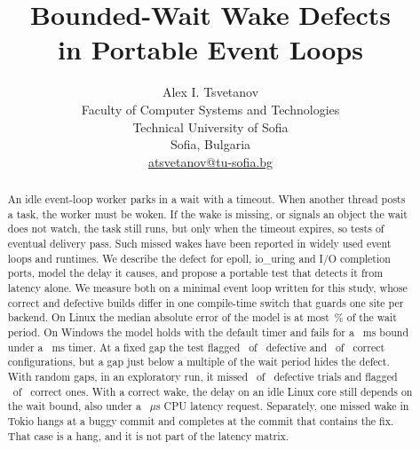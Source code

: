 
\usepackage{pgfplots}
\usepackage{pgfplotstable}
\pgfplotsset{compat=1.18}

\newcommand{\Beff}{B_{\mathrm{eff}}}
\newcommand{\PaperRepoAvailability}{is available}
\newcommand{\PaperRepo}{\url{https://github.com/Alex-Tsvetanov/paper-wake-defect}}
\newcommand{\BibHyphen}[1]{-}



\title{Bounded-Wait Wake Defects\\ in Portable Event Loops}

\author{Alex I. Tsvetanov\\
Faculty of Computer Systems and Technologies\\
Technical University of Sofia\\
Sofia, Bulgaria\\
\href{mailto:atsvetanov@tu-sofia.bg}{atsvetanov@tu-sofia.bg}}

\date{}
\maketitle

\begin{abstract}
An idle event-loop worker parks in a wait with a timeout. When another thread posts a task,
the worker must be woken. If the wake is missing, or signals an object the wait does not
watch, the task still runs, but only when the timeout expires, so tests of eventual delivery
pass. Such missed wakes have been reported in widely used event loops and runtimes. We describe
the defect for epoll, io\_uring and I/O completion ports, model the delay it causes, and
propose a portable test that detects it from latency alone. We measure both on a minimal event
loop written for this study, whose correct and defective builds differ in one compile-time
switch that guards one site per backend. On Linux the median absolute error of the model is at
most \WakeHOneLinuxMaxPct\,\% of the wait period. On Windows the model holds with the default
timer and fails for a \WakeBSmallMs~ms bound under a \WakeTimerRequestedMs~ms timer. At a fixed
gap the test flagged \WakeDetectDefectFlagged\ of \WakeDetectDefectConfigs\ defective and
\WakeDetectFixedFlagged\ of \WakeDetectFixedConfigs\ correct configurations, but a gap just
below a multiple of the wait period hides the defect. With random gaps, in an exploratory run,
it missed \WakeRandomDefectMissed\ of \WakeRandomDefectTrials\ defective trials and flagged
\WakeRandomFixedFlagged\ of \WakeRandomFixedTrials\ correct ones. With a correct wake, the
delay on an idle Linux core still depends on the wait bound, also under a \WakeQosUs~$\mu$s CPU
latency request. Separately, one missed wake in Tokio hangs at a buggy commit and completes
at the commit that contains the fix. That case is a hang, and it is not part of the latency
matrix.
\end{abstract}


